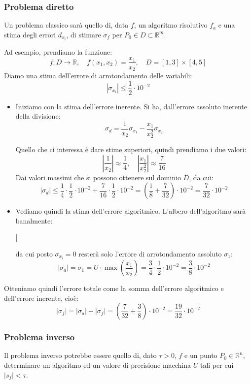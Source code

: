 \documentclass[a4paper,11pt]{article}
\begin{document}
\subsubsection{Problema diretto}
Un problema classico sarà quello di, data $f$, un algoritmo risolutivo $f_a$ e una stima degli errori $d_{x_i}$, di stimare $\sigma_f$ per $P_0 \in D \subset \mathbb{R}^m$.

Ad esempio, prendiamo la funzione:
$$
f : D \rightarrow \mathbb{R}, \quad f(x_1, x_2) = \frac{x_1}{x_2}, \quad D = [1, 3] \times [4, 5]
$$
Diamo una stima dell'errore di arrotondamento delle variabili:
$$
|\sigma_{x_i}| \leq \frac{1}{2} \cdot 10^{-2}
$$

\begin{itemize}
	\item
Iniziamo con la stima dell'errore inerente.
Si ha, dall'errore assoluto inerente della divisione:
$$
\sigma_d = \frac{1}{x_2} \sigma_{x_1} - \frac{x_1}{x_2^2} \sigma_{x_2} 
$$

Quello che ci interessa è dare stime superiori, quindi prendiamo i due valori:
$$
\left| \frac{1}{x_2} \right| \approx \frac{1}{4}, \quad
\left| \frac{x_1}{x_2^2} \right| \approx \frac{7}{16}
$$
Dai valori massimi che si possono ottenere sul dominio $D$, da cui:
$$
|\sigma_d| \leq \frac{1}{4} \cdot \frac{1}{2} \cdot 10^{-2} + \frac{7}{16} \cdot \frac{1}{2} \cdot 10^{-2} = \left( \frac{1}{8} + \frac{7}{32} \right) \cdot 10^{-2} = \frac{7}{32} \cdot 10^{-2} 
$$

	\item
Vediamo quindi la stima dell'errore algoritmico.
L'albero dell'algoritmo sarà banalmente:
\begin{center}
	\begin{forest}
		[
			{$r_1 = \frac{x_1}{x_2}$}
			[{$x_1$}]
			[{$x_2$}]
		]	
	\end{forest}
\end{center}
da cui posto $\sigma_{x_i} = 0$ resterà solo l'errore di arrotondamento assoluto $\sigma_1$:
$$
|\sigma_a| = \sigma_1 = U \cdot \max\left( \frac{x_1}{x_2} \right) = \frac{3}{4} \cdot \frac{1}{2} \cdot 10^{-2} = \frac{3}{8} \cdot 10^{-2}
$$
\end{itemize}

Otteniamo quindi l'errore totale come la somma dell'errore algoritmico e dell'errore inerente, cioè:
$$
|\sigma_f| = |\sigma_a| + |\sigma_f| = \left( \frac{7}{32} + \frac{3}{8} \right) \cdot 10^{-2} = \frac{19}{32} \cdot 10^{-2}
$$

\subsubsection{Problema inverso}
Il problema inverso potrebbe essere quello di, dato $\tau > 0$, $f$ e un punto $P_0 \in \mathbb{R}^n$, determinare un algoritmo ed un valore di precisione macchina $U$ tali per cui $|s_f| < \tau$.
\end{document}
